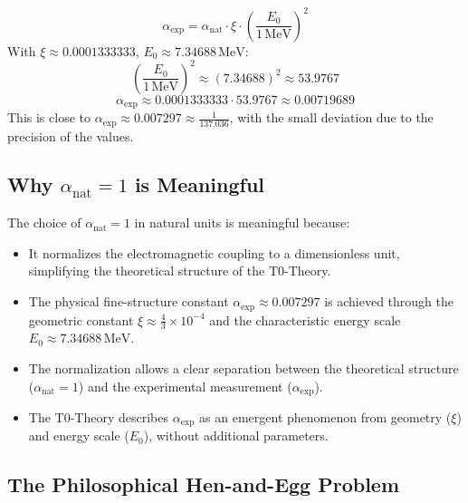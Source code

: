 \documentclass[12pt,a4paper]{article}
\theoremstyle{definition}
\begin{document}
\[
\alpha_{\text{exp}} = \alpha_{\text{nat}} \cdot \xi \cdot \left(\frac{E_0}{1 \, \text{MeV}}\right)^2
\]
With $\xi \approx 0.0001333333$, $E_0 \approx 7.34688 \, \text{MeV}$:
\[
\left(\frac{E_0}{1 \, \text{MeV}}\right)^2 \approx (7.34688)^2 \approx 53.9767
\]
\[
\alpha_{\text{exp}} \approx 0.0001333333 \cdot 53.9767 \approx 0.00719689
\]
This is close to $\alpha_{\text{exp}} \approx 0.007297 \approx \frac{1}{137.036}$, with the small deviation due to the precision of the values.

\subsection*{Why $\alpha_{\text{nat}} = 1$ is Meaningful}

The choice of $\alpha_{\text{nat}} = 1$ in natural units is meaningful because:
\begin{itemize}
	\item It normalizes the electromagnetic coupling to a dimensionless unit, simplifying the theoretical structure of the T0-Theory.
	\item The physical fine-structure constant $\alpha_{\text{exp}} \approx 0.007297$ is achieved through the geometric constant $\xi \approx \frac{4}{3} \times 10^{-4}$ and the characteristic energy scale $E_0 \approx 7.34688 \, \text{MeV}$.
	\item The normalization allows a clear separation between the theoretical structure ($\alpha_{\text{nat}} = 1$) and the experimental measurement ($\alpha_{\text{exp}}$).
	\item The T0-Theory describes $\alpha_{\text{exp}}$ as an emergent phenomenon from geometry ($\xi$) and energy scale ($E_0$), without additional parameters.
\end{itemize}
\subsection*{The Philosophical Hen-and-Egg Problem}
\end{document}

